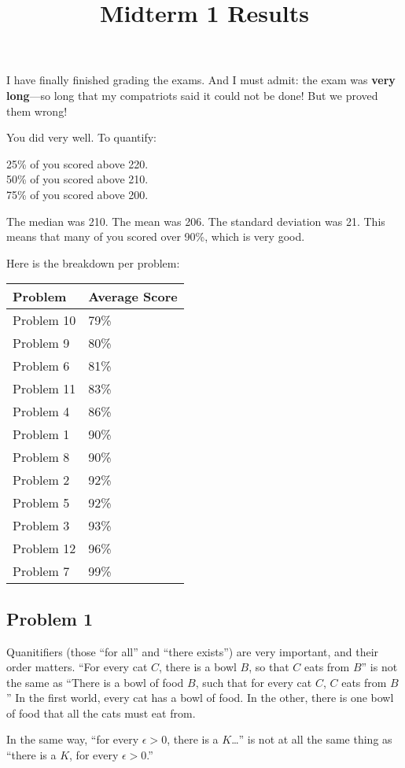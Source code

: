 \documentclass[12pt]{article}
\title{Midterm 1 Results}
\begin{document}
\large

I have finally finished grading the exams.  And I must admit: the exam
was \textbf{very long}---so long that my compatriots said it could not
be done!  But we proved them wrong!

You did very well.  To quantify:
\begin{center}
25\% of you scored above 220. \\
50\% of you scored above 210. \\
75\% of you scored above 200.
\end{center}
The median was 210.  The mean was 206.  The standard deviation was 21.
This means that many of you scored over 90\%, which is very good.

Here is the breakdown per problem:
\begin{center}
\begin{tabular}{ll}
\textbf{Problem} & \textbf{Average Score} \\
\hline
Problem 10	& 79\% \\
Problem 9	& 80\% \\
Problem 6	& 81\% \\
Problem 11	& 83\% \\ 
Problem 4	& 86\% \\
Problem 1	& 90\% \\
Problem 8	& 90\% \\
Problem 2	& 92\% \\
Problem 5	& 92\% \\
Problem 3	& 93\% \\
Problem 12	& 96\% \\
Problem 7	& 99\%
\end{tabular}
\end{center}

\subsection*{Problem 1}

Quanitifiers (those ``for all'' and ``there exists'') are very
important, and their order matters.  ``For every cat $C$, there is a
bowl $B$, so that $C$ eats from $B$'' is not the same as ``There is a
bowl of food $B$, such that for every cat $C$, $C$ eats from $B$'' In
the first world, every cat has a bowl of food.  In the other, there is
one bowl of food that all the cats must eat from.

In the same way, ``for every $\epsilon > 0$, there is a $K$\ldots'' is not
at all the same thing as ``there is a $K$, for every $\epsilon > 0$.''
\end{document}
